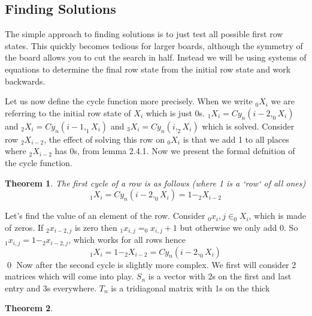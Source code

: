 \documentclass{article}
\newtheorem{theorem}{Theorem}[subsection]
\begin{document}
  \subsection{Finding Solutions}
  The simple approach to finding solutions is to just test all possible first row states. This quickly becomes tedious for larger boards, although the symmetry of the board allows you to cut the search in half. Instead we will be using systems of equations to determine the final row state from the initial row state and work backwards.\par
  Let us now define the cycle function more precisely. When we write $_0X_i$ we are referring to the initial row state of $X_i$ which is just 0s. $_1X_i=Cy_n(i-2,_0X_i)$ and $_2X_i=Cy_n(i-1,_1X_i)$ and $_3X_i=Cy_n(i,_2X_i)$ which is solved. Consider row $_2X_{i-2}$, the effect of solving this row on $_0X_i$ is that we add 1 to all places where $_2X_{i-2}$ has 0s, from lemma 2.4.1. Now we present the formal defnition of the cycle function.
  \begin{theorem}
    The first cycle of a row is as follows (where 1 is a `row` of all ones)
    \[
      _1X_i=Cy_n(i-2,_0X_i)=1-_2X_{i-2}
    \]
  \end{theorem}
  Let's find the value of an element of the row. Consider $_0x_i,j\in_0X_i$, which is made of zeros. If $_2x_{i-2,j}$ is zero then $_1x_{i,j}=_0x_{i,j}+1$ but otherwise we only add 0. So $_1x_{i,j}=1-_2x_{i-2,j}$, which works for all rows hence
  \[_1X_i=1-_2X_{i-2}=Cy_n(i-2,_0X_i)\]\qed
  Now after the second cycle is slightly more complex. We first will consider 2 matrices which will come into play. $S_n$ is a vector with 2s on the first and last entry and 3s everywhere. $T_n$ is a tridiagonal matrix with 1s on the thick 
  \begin{theorem}

  \end{theorem}
\end{document}
